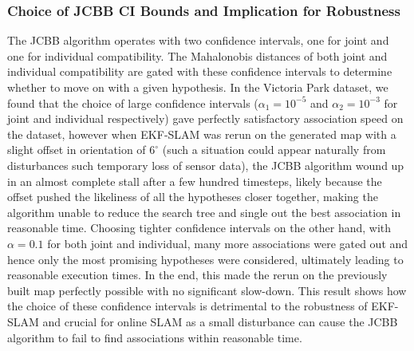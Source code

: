 \subsubsection{Choice of JCBB CI Bounds and Implication for Robustness}
The JCBB algorithm operates with two confidence intervals, one for joint and one for individual compatibility. The Mahalonobis distances of both joint and individual compatibility are gated with these confidence intervals to determine whether to move on with a given hypothesis.\cite{jcbb} In the Victoria Park dataset, we found that the choice of large confidence intervals ($\alpha_1 = 10^{-5}$ and $\alpha_2 = 10^{-3}$ for joint and individual respectively) gave perfectly satisfactory association speed on the dataset, however when EKF-SLAM was rerun on the generated map with a slight offset in orientation of $6^\circ$ (such a situation could appear naturally from disturbances such temporary loss of sensor data), the JCBB algorithm wound up in an almost complete stall after a few hundred timesteps, likely because the offset pushed the likeliness of all the hypotheses closer together, making the algorithm unable to reduce the search tree and single out the best association in reasonable time. Choosing tighter confidence intervals on the other hand, with $\alpha = 0.1$ for both joint and individual, many more associations were gated out and hence only the most promising hypotheses were considered, ultimately leading to reasonable execution times. In the end, this made the rerun on the previously built map perfectly possible with no significant slow-down. This result shows how the choice of these confidence intervals is detrimental to the robustness of EKF-SLAM and crucial for online SLAM as a small disturbance can cause the JCBB algorithm to fail to find associations within reasonable time.

